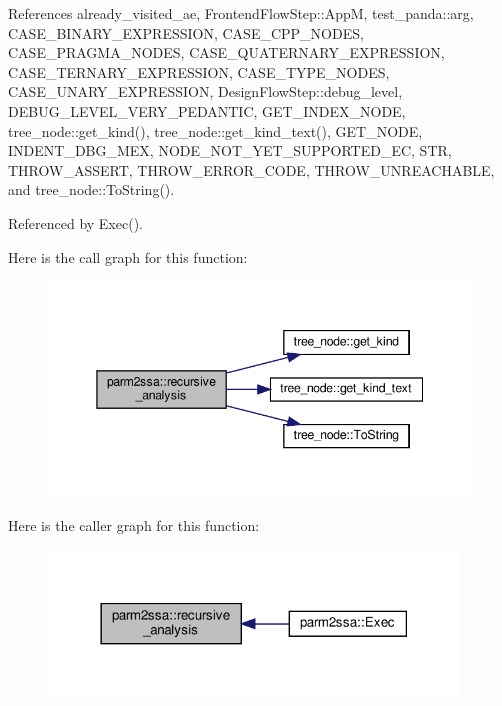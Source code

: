 References already\+\_\+visited\+\_\+ae, Frontend\+Flow\+Step\+::\+AppM, test\+\_\+panda\+::arg, C\+A\+S\+E\+\_\+\+B\+I\+N\+A\+R\+Y\+\_\+\+E\+X\+P\+R\+E\+S\+S\+I\+ON, C\+A\+S\+E\+\_\+\+C\+P\+P\+\_\+\+N\+O\+D\+ES, C\+A\+S\+E\+\_\+\+P\+R\+A\+G\+M\+A\+\_\+\+N\+O\+D\+ES, C\+A\+S\+E\+\_\+\+Q\+U\+A\+T\+E\+R\+N\+A\+R\+Y\+\_\+\+E\+X\+P\+R\+E\+S\+S\+I\+ON, C\+A\+S\+E\+\_\+\+T\+E\+R\+N\+A\+R\+Y\+\_\+\+E\+X\+P\+R\+E\+S\+S\+I\+ON, C\+A\+S\+E\+\_\+\+T\+Y\+P\+E\+\_\+\+N\+O\+D\+ES, C\+A\+S\+E\+\_\+\+U\+N\+A\+R\+Y\+\_\+\+E\+X\+P\+R\+E\+S\+S\+I\+ON, Design\+Flow\+Step\+::debug\+\_\+level, D\+E\+B\+U\+G\+\_\+\+L\+E\+V\+E\+L\+\_\+\+V\+E\+R\+Y\+\_\+\+P\+E\+D\+A\+N\+T\+IC, G\+E\+T\+\_\+\+I\+N\+D\+E\+X\+\_\+\+N\+O\+DE, tree\+\_\+node\+::get\+\_\+kind(), tree\+\_\+node\+::get\+\_\+kind\+\_\+text(), G\+E\+T\+\_\+\+N\+O\+DE, I\+N\+D\+E\+N\+T\+\_\+\+D\+B\+G\+\_\+\+M\+EX, N\+O\+D\+E\+\_\+\+N\+O\+T\+\_\+\+Y\+E\+T\+\_\+\+S\+U\+P\+P\+O\+R\+T\+E\+D\+\_\+\+EC, S\+TR, T\+H\+R\+O\+W\+\_\+\+A\+S\+S\+E\+RT, T\+H\+R\+O\+W\+\_\+\+E\+R\+R\+O\+R\+\_\+\+C\+O\+DE, T\+H\+R\+O\+W\+\_\+\+U\+N\+R\+E\+A\+C\+H\+A\+B\+LE, and tree\+\_\+node\+::\+To\+String().



Referenced by Exec().

Here is the call graph for this function\+:
\nopagebreak
\begin{figure}[H]
\begin{center}
\leavevmode
\includegraphics[width=345pt]{dc/d7a/classparm2ssa_a44867e8c5b5462d813b189778657809e_cgraph}
\end{center}
\end{figure}
Here is the caller graph for this function\+:
\nopagebreak
\begin{figure}[H]
\begin{center}
\leavevmode
\includegraphics[width=309pt]{dc/d7a/classparm2ssa_a44867e8c5b5462d813b189778657809e_icgraph}
\end{center}
\end{figure}


